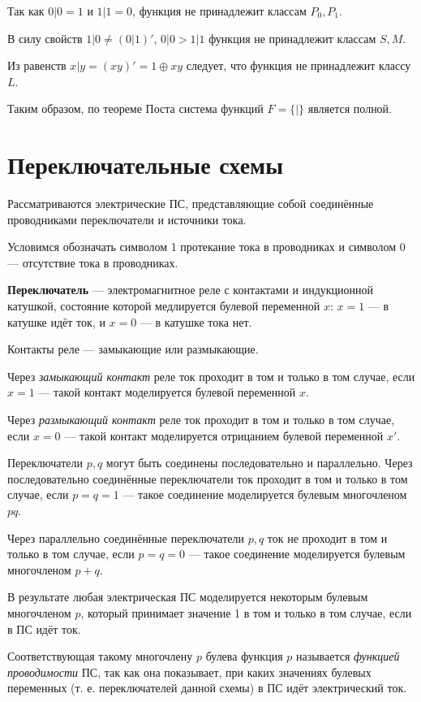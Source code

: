 Так как $0|0=1$ и $1|1=0$, функция не принадлежит классам $P_0, P_1$.

В силу свойств $1|0 \neq (0|1)'$, $0|0>1|1$ функция не принадлежит классам $S, M$.

Из равенств $x|y=(xy)'=1\oplus xy$ следует, что функция не принадлежит классу $L$.

Таким образом, по теореме Поста система функций $F=\{|\}$ является полной.

\section{Переключательные схемы}
Рассматриваются электрические ПС, представляющие собой соединённые проводниками переключатели и источники тока.

Условимся обозначать символом 1 протекание тока в проводниках и символом 0 --- отсутствие тока в проводниках.

\dftion \textbf{Переключатель} --- электромагнитное реле с контактами и индукционной катушкой, состояние которой медлируется булевой переменной $x$: $x = 1$ --- в катушке идёт ток, и $x = 0$ --- в катушке тока нет.

Контакты реле --- замыкающие или размыкающие.

Через \textit{замыкающий контакт} реле ток проходит в том и только в том случае, если $x = 1$ --- такой контакт моделируется булевой переменной $x$.

Через \textit{размыкающий контакт} реле ток проходит в том и только в том случае, если $x = 0$ --- такой контакт моделируется отрицанием булевой переменной $x'$.

Переключатели $p, q$ могут быть соединены последовательно и параллельно. Через последовательно соединённые переключатели ток проходит в том и только в том случае, если $p=q=1$ --- такое соединение моделируется булевым многочленом $pq$.

Через параллельно соединённые переключатели $p,q$ ток не проходит в том и только в том случае, если $p=q=0$ --- такое соединение моделируется булевым многочленом $p+q$.

В результате любая электрическая ПС моделируется некоторым булевым многочленом $p$, который принимает значение 1 в том и только в том случае, если в ПС идёт ток.

Соответствующая такому многочлену $p$ булева функция $p$ называется \textit{функцией проводимости} ПС, так как она показывает, при каких значениях булевых переменных (т. е. переключателей данной схемы) в ПС идёт электрический ток.

